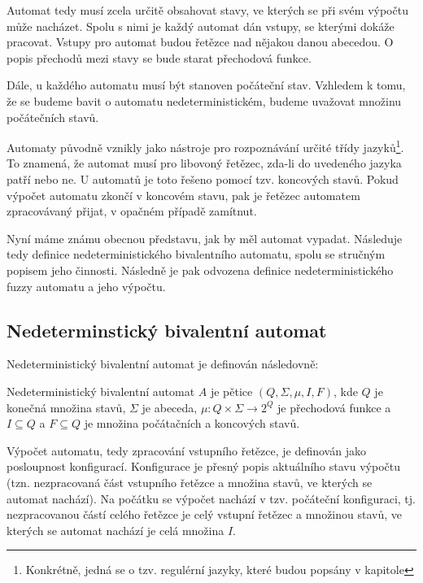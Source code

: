 \documentclass[a4paper,10pt]{article}
\begin{document}
Automat tedy musí zcela určitě obsahovat stavy, ve kterých se při svém výpočtu může nacházet. Spolu s nimi je každý automat dán vstupy, se kterými dokáže pracovat. Vstupy pro automat budou řetězce nad nějakou danou abecedou. O popis přechodů mezi stavy se bude starat přechodová funkce.

Dále, u každého automatu musí být stanoven počáteční stav. Vzhledem k tomu, že se budeme bavit o automatu nedeterministickém, budeme uvažovat množinu počátečních stavů.

Automaty původně vznikly jako nástroje pro rozpoznávání určité třídy jazyků\footnote{Konkrétně, jedná se o tzv. regulérní jazyky, které budou popsány v kapitole }. To znamená, že automat musí pro libovoný řetězec, zda-li do uvedeného jazyka patří nebo ne. U automatů je toto řešeno pomocí tzv. koncových stavů. Pokud výpočet automatu zkončí v koncovém stavu, pak je řetězec automatem zpracovávaný přijat, v opačném případě zamítnut.

Nyní máme známu obecnou představu, jak by měl automat vypadat. Následuje tedy definice nedeterministického bivalentního automatu, spolu se stručným popisem jeho činnosti. Následně je pak odvozena definice nedeterministického fuzzy automatu a jeho výpočtu.


\subsection{Nedeterminstický bivalentní automat}
Nedeterministický bivalentní automat je definován následovně:

\begin{definition}\label{def-NedBivAut}
 Nedeterministický bivalentní automat $A$ je pětice $(Q, \Sigma, \mu, I, F)$, kde $Q$ je konečná množina stavů, $\Sigma$ je abeceda, $\mu: Q \times \Sigma \rightarrow 2^Q$ je přechodová funkce a $I \subseteq Q$ a $F \subseteq Q$ je množina počátačních a koncových stavů.
\end{definition}


Výpočet automatu, tedy zpracování vstupního řetězce, je definován jako posloupnost konfigurací. Konfigurace je přesný popis aktuálního stavu výpočtu (tzn. nezpracovaná část vstupního řetězce a množina stavů, ve kterých se automat nachází). Na počátku se výpočet nachází v tzv. počáteční konfiguraci, tj. nezpracovanou částí celého řetězce je celý vstupní řetězec a množinou stavů, ve kterých se automat nachází je celá množina $I$.
\end{document}
